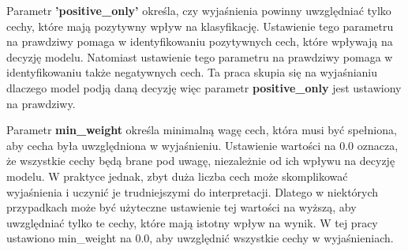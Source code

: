 Parametr \textbf{'positive\_only'} określa, czy wyjaśnienia powinny uwzględniać tylko cechy, które mają pozytywny wpływ na klasyfikację.
Ustawienie tego parametru na prawdziwy pomaga w identyfikowaniu pozytywnych cech, które wpływają na decyzję modelu.
Natomiast ustawienie tego parametru na prawdziwy pomaga w identyfikowaniu także negatywnych cech.
Ta praca skupia się na wyjaśnianiu dlaczego model podją daną decyzję więc parametr \textbf{positive\_only} jest ustawiony na prawdziwy.

Parametr \textbf{min\_weight} określa minimalną wagę cech, która musi być spełniona, aby cecha była uwzględniona w wyjaśnieniu.
Ustawienie wartości na 0.0 oznacza, że wszystkie cechy będą brane pod uwagę, niezależnie od ich wpływu na decyzję modelu.
W praktyce jednak, zbyt duża liczba cech może skomplikować wyjaśnienia i uczynić je trudniejszymi do interpretacji.
Dlatego w niektórych przypadkach może być użyteczne ustawienie tej wartości na wyższą, aby uwzględniać tylko te cechy, które mają istotny wpływ na wynik.
W tej pracy ustawiono min\_weight na 0.0, aby uwzględnić wszystkie cechy w wyjaśnieniach.


